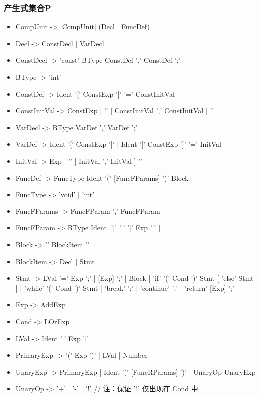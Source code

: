 \documentclass[UTF8,a4paper,10pt]{ctexart}
\begin{document}
\subsubsection{产生式集合P}
\begin{itemize}
  \item CompUnit     -> [CompUnit] (Decl | FuncDef)
  \item Decl         -> ConstDecl | VarDecl
  \item ConstDecl    -> 'const' BType ConstDef { ',' ConstDef } ';'
  \item BType        -> 'int'
  \item ConstDef     -> Ident { '[' ConstExp ']' } '=' ConstInitVal
  \item ConstInitVal -> ConstExp
                | '{' [ ConstInitVal { ',' ConstInitVal } ] '}'
  \item VarDecl      -> BType VarDef { ',' VarDef } ';'
  \item VarDef       -> Ident { '[' ConstExp ']' }
                | Ident { '[' ConstExp ']' } '=' InitVal
  \item InitVal      -> Exp
                | '{' [ InitVal { ',' InitVal } ] '}'
  \item FuncDef      -> FuncType Ident '(' [FuncFParams] ')' Block
  \item FuncType     -> 'void' | 'int'
  \item FuncFParams  -> FuncFParam { ',' FuncFParam }
  \item FuncFParam   -> BType Ident ['[' ']' { '[' Exp ']' }]
  \item Block        -> '{' { BlockItem } '}'
  \item BlockItem    -> Decl | Stmt
  \item Stmt         -> LVal '=' Exp ';'
                | [Exp] ';'
                | Block
                | 'if' '(' Cond ')' Stmt [ 'else' Stmt ]
                | 'while' '(' Cond ')' Stmt
                | 'break' ';'
                | 'continue' ';'
                | 'return' [Exp] ';'
  \item Exp          -> AddExp
  \item Cond         -> LOrExp
  \item LVal         -> Ident {'[' Exp ']'}
  \item PrimaryExp   -> '(' Exp ')' | LVal | Number
  \item UnaryExp     -> PrimaryExp
                | Ident '(' [FuncRParams] ')'
                | UnaryOp UnaryExp
  \item UnaryOp      -> '+' | '-' | '!'  // 注：保证 '!' 仅出现在 Cond 中

\end{itemize}
\end{document}
